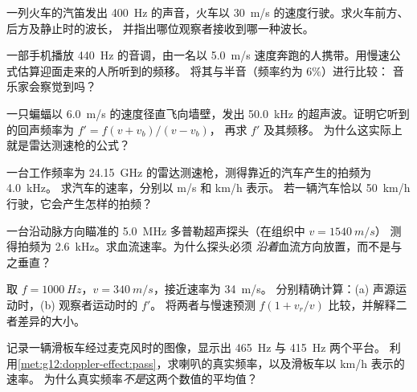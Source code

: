 \begin{exercise}[$\star$]\label{exo:g12:doppler-effect:4}
一列火车的汽笛发出 \qty{400}{Hz} 的声音，火车以 \qty{30}{m/s} 的速度行驶。求火车前方、后方及静止时的波长，
并指出哪位观察者接收到哪一种波长。
\end{exercise}

\begin{exercise}[$\star$]\label{exo:g12:doppler-effect:5}
一部手机播放 \qty{440}{Hz} 的音调，由一名以 \qty{5.0}{m/s} 速度奔跑的人携带。用慢速公式估算迎面走来的人所听到的频移。
将其与半音（频率约为 $6\%$）进行比较：
音乐家会察觉到吗？
\end{exercise}

\begin{exercise}[$\star\star$]\label{exo:g12:doppler-effect:6}
一只蝙蝠以 \qty{6.0}{m/s} 的速度径直飞向墙壁，发出 \qty{50.0}{kHz} 的超声波。证明它听到的回声频率为 $f' = f(v + v_b)/(v - v_b)$，
再求 $f'$ 及其频移。
为什么这实际上就是雷达测速枪的公式？
\end{exercise}

\begin{exercise}[$\star\star$]\label{exo:g12:doppler-effect:7}
一台工作频率为 \qty{24.15}{GHz} 的雷达测速枪，测得靠近的汽车产生的拍频为 \qty{4.0}{kHz}。
求汽车的速率，分别以 \unit{m/s} 和 \unit{km/h} 表示。
若一辆汽车恰以 \qty{50}{km/h} 行驶，它会产生怎样的拍频？
\end{exercise}

\begin{exercise}[$\star\star$]\label{exo:g12:doppler-effect:8}
一台沿动脉方向瞄准的 \qty{5.0}{MHz} 多普勒超声探头（在组织中 $v = \qty{1540}{m/s}$）
测得拍频为 \qty{2.6}{kHz}。求血流速率。为什么探头必须
\emph{沿着}血流方向放置，而不是与之垂直？
\end{exercise}

\begin{exercise}[$\star\star$]\label{exo:g12:doppler-effect:9}
取 $f = \qty{1000}{Hz}$，$v = \qty{340}{m/s}$，接近速率为 \qty{34}{m/s}。
分别精确计算：(a) 声源运动时，(b) 观察者运动时的 $f'$。
将两者与慢速预测 $f(1 + v_r/v)$ 比较，并解释二者差异的大小。
\end{exercise}

\begin{exercise}[$\star\star$]\label{exo:g12:doppler-effect:10}
记录一辆滑板车经过麦克风时的图像，显示出 \qty{465}{Hz} 与 \qty{415}{Hz} 两个平台。
利用\cref{met:g12:doppler-effect:pass}，求喇叭的真实频率，以及滑板车以 \unit{km/h} 表示的速率。
为什么真实频率\emph{不是}这两个数值的平均值？
\end{exercise}

